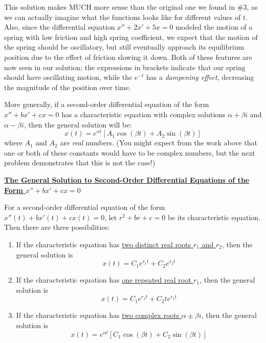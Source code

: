 \documentclass[main]{subfiles}
\begin{document}
\begin{enumerate}
\begin{solution}
This solution makes MUCH more sense than the original one we found in \#3, as we can actually imagine what the functions looks like for different values of $t$. Also, since the differential equation $x'' + 2x' + 5x = 0$ modeled the motion of a spring with low friction and high spring coefficient, we expect that the motion of the spring should be oscillatory, but still eventually approach its equilibrium position due to the effect of friction slowing it down. Both of these features are now seen in our solution; the expressions in brackets indicate that our spring should have oscillating motion, while the $e^{-t}$ has a \textit{dampening effect}, decreasing the magnitude of the position over time. 

More generally, if a second-order differential equation of the form $x'' + bx' + cx = 0$ has a characteristic equation with complex solutions $\alpha + \beta i$ and $\alpha - \beta i$, then the general solution will be:
$$\boxed{x(t)=e^{\alpha t}\left[A_1\cos(\beta t)+A_2\sin(\beta t)\right]}$$
where $A_1$ and $A_2$ are \textit{real} numbers. (You might expect from the work above that one or both of these constants would have to be complex numbers, but the next problem demonstrates that this is not the case!)
\end{solution}
\end{enumerate}
\probonly{\newpage}



\begin{framed}
\begin{center}
\textbf{\uline{The General Solution to Second-Order Differential Equations of the Form $x'' +bx'+cx=0$}}
\end{center}

\flushleft
For a second-order differential equation of the form $x''(t)+bx'(t)+cx(t)=0$, let $r^2+br+c=0$ be its characteristic equation. Then there are three possibilities:

\begin{enumerate}
\item If the characteristic equation has \uline{two distinct real roots $r_1$ and $r_2$}, then the general solution is $$\boxed{x(t)=C_1e^{r_1t}+C_2e^{r_2t}}$$
\item If the characteristic equation has \uline{one repeated real root $r_1$}, then the general solution is $$\boxed{x(t)=C_1e^{r_1t}+C_2te^{r_1t}}$$
\item If the characteristic equation has \uline{two complex roots $\alpha\pm\beta i$}, then the general solution is $$\boxed{x(t)=e^{\alpha t}[C_1\cos(\beta t)+C_2\sin(\beta t)]}$$
\end{enumerate}
\end{framed}
\end{document}
